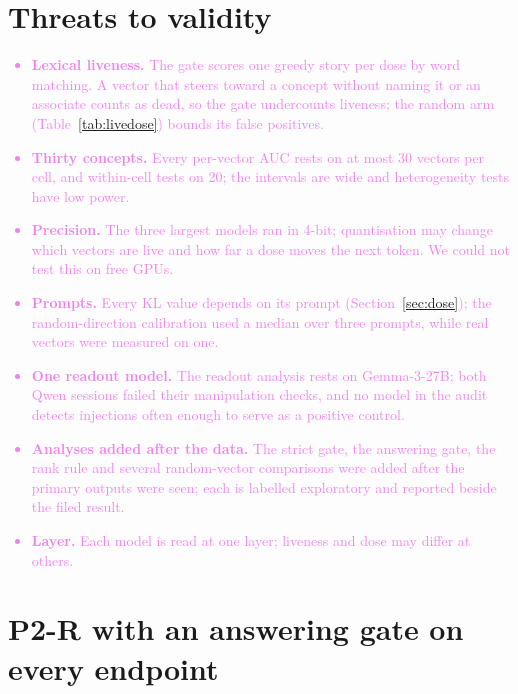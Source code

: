 \documentclass[11pt,a4paper]{article}
\newcommand{\yes}{\textup{\textsc{yes}}}
\newcommand{\no}{\textup{\textsc{no}}}
\newcommand{\draft}[1]{\textcolor{violet}{#1}}
\begin{document}
\section{Threats to validity}
\label{app:threats}
\draft{\begin{itemize}
  \item \textbf{Lexical liveness.} The gate scores one greedy story per dose by word matching. A
  vector that steers toward a concept without naming it or an associate counts as dead, so the
  gate undercounts liveness; the random arm (Table~\ref{tab:livedose}) bounds its false positives.
  \item \textbf{Thirty concepts.} Every per-vector AUC rests on at most 30 vectors per cell, and
  within-cell tests on 20; the intervals are wide and heterogeneity tests have low power.
  \item \textbf{Precision.} The three largest models ran in 4-bit; quantisation may change which
  vectors are live and how far a dose moves the next token. We could not test this on free GPUs.
  \item \textbf{Prompts.} Every KL value depends on its prompt (Section~\ref{sec:dose}); the
  random-direction calibration used a median over three prompts, while real vectors were measured on
  one.
  \item \textbf{One readout model.} The readout analysis rests on Gemma-3-27B; both Qwen sessions
  failed their manipulation checks, and no model in the audit detects injections often enough to
  serve as a positive control.
  \item \textbf{Analyses added after the data.} The strict gate, the answering gate, the rank rule
  and several random-vector comparisons were added after the primary outputs were seen; each is
  labelled exploratory and reported beside the filed result.
  \item \textbf{Layer.} Each model is read at one layer; liveness and dose may differ at others.
\end{itemize}}

\section{P2-R with an answering gate on every endpoint}
\label{app:gated}
\begin{table}[t]
\centering
\resizebox{\textwidth}{!}{}
\caption{\draft{P2-R on Gemma-3-27B, real vectors, restricted to items whose \yes{}+\no{} mass is at
least 0.5 at strength 0 and at the strength scored: items answering ($n$), median change in the
log-odds of \yes{}, and Wilcoxon $p$ (not computed below 6 items). Last row: the introspective
change for real and impact-matched random vectors among concepts answering under both. The gate was
added in revision after the primary output was seen; exploratory.}}
\label{tab:gated}
\end{table}
\end{document}
